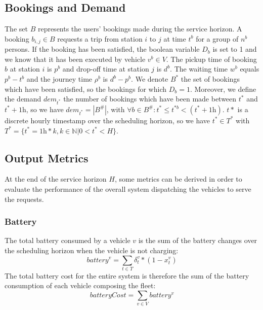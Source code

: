 \documentclass[12pt,a4paper]{article}
\begin{document}
\subsection{Bookings and Demand}\label{bookings}
The set $B$ represents the users' bookings made during the service horizon. A booking $b_{i,j} \in B$ requests a trip from station $i$ to $j$ at time $t^{b}$ for a group of $n^{b}$ persons. If the booking has been satisfied, the boolean variable $D_{b}$ is set to 1 and we know that it has been executed by vehicle $v^{b} \in V$. The pickup time of booking $b$ at station $i$ is $p^{b}$ and drop-off time at station $j$ is $d^{b}$. The waiting time $w^{b}$ equals $p^{b} - t^{b}$ and the journey time $\rho^{b}$ is $d^{b} - p^{b}$. We denote $B^{*}$ the set of bookings which have been satisfied, so the bookings for which $D_{b} = 1$. Moreover, we define the demand $dem_{t^{*}}$ the number of bookings which have been made between $t^{*}$ and $t^{*} + 1\text{h}$, so we have $dem_{t^{*}} = |B^{\#}|$, with $\forall b \in B^{\#}: t^{*} \leq t^{*b} < (t^{*}+1\text{h})$. $t{*}$ is a discrete hourly timestamp over the scheduling horizon, so we have $t^{*} \in T^{*}$ with $T^{*} = \{t^{*} = 1\text{h} * k, k \in \mathbb{N} | 0 < t^{*} < H\}$.

\subsection{Output Metrics}\label{metrics}
At the end of the service horizon $H$, some metrics can be derived in order to evaluate the performance of the overall system dispatching the vehicles to serve the requests. 

\subsubsection*{Battery}
The total battery consumed by a vehicle $v$ is the sum of the battery changes over the scheduling horizon when the vehicle is not charging:
$$battery^{v} = \sum_{t \in T}\delta^{v}_{t} * (1-x^{v}_{t}) $$
The total battery cost for the entire system is therefore the sum of the battery consumption of each vehicle composing the fleet:
$$batteryCost = \sum_{v \in V}battery^{v}$$
\end{document}
